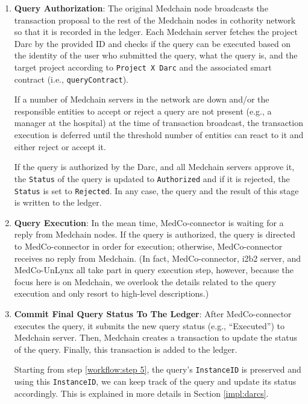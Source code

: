 \begin{enumerate}
    \item \textbf{Query Authorization}: The original Medchain node broadcasts the transaction proposal to the rest of the Medchain nodes in cothority network so that it is recorded in the ledger. Each Medchain server fetches the project Darc by the provided ID and checks if the query can be executed based on the identity of the user who submitted the query, what the query is, and the target project according to \texttt{Project X Darc} and the associated smart contract (i.e., \texttt{queryContract}).
    
    If a number of Medchain servers in the network are down and/or the responsible entities to accept or reject a query are not present (e.g., a manager at the hospital) at the time of transaction broadcast, the transaction execution is deferred until the threshold number of entities can react to it and either reject or accept it.  
    
    If the query is authorized by the Darc, and all Medchain servers approve it, the \texttt{Status} of the query is updated to \texttt{Authorized} and if it is rejected, the \texttt{Status} is set to \texttt{Rejected}. In any case, the query and the result of this stage is written to the ledger.  
    
    \item \textbf{Query Execution}: In the mean time, MedCo-connector is waiting for a reply from Medchain nodes. If the query is authorized, the query is directed to MedCo-connector in order for execution; otherwise, MedCo-connector receives no reply from Medchain. (In fact, MedCo-connector, i2b2 server, and MedCo-UnLynx all take part in query execution step, however, because the focus here is on Medchain, we overlook the details related to the query execution and only resort to high-level descriptions.) 
    
    \item \textbf{Commit Final Query Status To The Ledger}: After MedCo-connector executes the query, it submits the new query status (e.g., “Executed”) to Medchain server. Then, Medchain creates a transaction to update the status of the query. Finally, this transaction is added to the ledger. 

Starting from step \ref{workflow:step 5}, the query's \texttt{InstanceID} is preserved and using this \texttt{InstanceID}, we can keep track of the query and update its status accordingly. This is explained in more details in Section \ref{impl:darcs}.
    
\end{enumerate}
 

